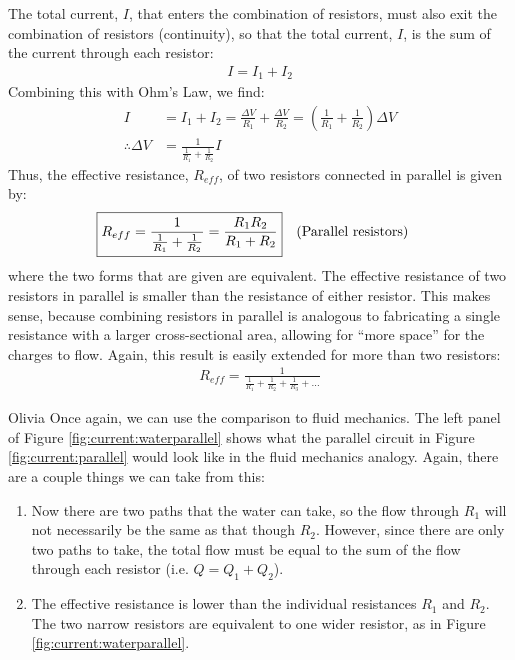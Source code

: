 The total current, $I$, that enters the combination of resistors, must also exit the combination of resistors (continuity), so that the total current, $I$, is the sum of the current through each resistor:
\begin{align*}
I=I_1+I_2
\end{align*}
Combining this with Ohm's Law, we find:
\begin{align*}
I&=I_1+I_2=\frac{\Delta V}{R_1}+\frac{\Delta V}{R_2}=\left( \frac{1}{R_1}+\frac{1}{R_2} \right)\Delta V\\
\therefore \Delta V &= \frac{1}{\frac{1}{R_1}+\frac{1}{R_2}}I
\end{align*}
Thus, the effective resistance, $R_{eff}$, of two resistors connected in parallel is given by:
\begin{align*}
\Aboxed{R_{eff}=\frac{1}{\frac{1}{R_1}+\frac{1}{R_2}}=\frac{R_1R_2}{R_1+R_2}}\quad \text{(Parallel resistors)}
\end{align*}
where the two forms that are given are equivalent. The effective resistance of two resistors in parallel is smaller than the resistance of either resistor. This makes sense, because combining resistors in parallel is analogous to fabricating a single resistance with a larger cross-sectional area, allowing for ``more space'' for the charges to flow. Again, this result is easily extended for more than two resistors:
\begin{align*}
R_{eff}=\frac{1}{\frac{1}{R_1}+\frac{1}{R_2}+\frac{1}{R_3}+\dots}
\end{align*}

\begin{studentOpinion}{Olivia}
Once again, we can use the comparison to fluid mechanics. The left panel of Figure \ref{fig:current:waterparallel} shows what the parallel circuit in Figure \ref{fig:current:parallel} would look like in the fluid mechanics analogy. Again, there are a couple things we can take from this:
\begin{enumerate}
\item Now there are two paths that the water can take, so the flow through $R_1$ will not necessarily be the same as that though $R_2$. However, since there are only two paths to take, the total flow must be equal to the sum of the flow through each resistor (i.e. $Q=Q_1+Q_2$).
\item The effective resistance is lower than the individual resistances $R_1$ and $R_2$. The two narrow resistors are equivalent to one wider resistor, as in Figure \ref{fig:current:waterparallel}.
\end{enumerate}
\end{studentOpinion}

